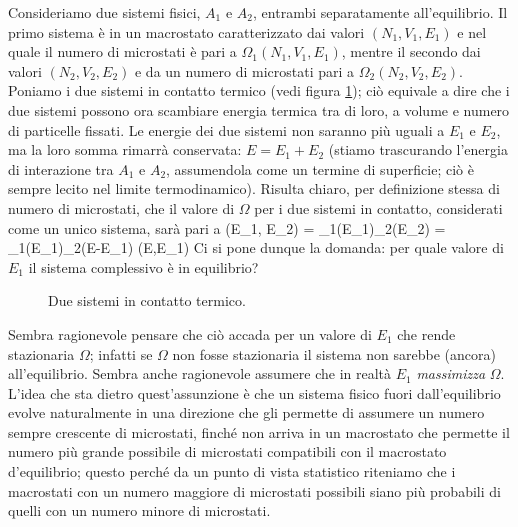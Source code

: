 Consideriamo due sistemi fisici, $A_{1}$ e $A_{2}$, entrambi separatamente all'equilibrio. Il primo sistema è in un macrostato caratterizzato dai valori $(N_{1},V_{1},E_{1})$ e nel quale il numero di microstati è pari a $\Omega_{1}(N_{1},V_{1},E_{1})$, mentre il secondo dai valori $(N_{2},V_{2},E_{2})$ e da un numero di microstati pari a $\Omega_{2}(N_{2},V_{2},E_{2})$. Poniamo i due sistemi in contatto termico (vedi figura \ref{fig:02-a1a2}); ciò equivale a dire che i due sistemi possono ora scambiare energia termica tra di loro, a volume e numero di particelle fissati. Le energie dei due sistemi non saranno più uguali a $E_{1}$ e $E_{2}$, ma la loro somma rimarrà conservata: $E = E_{1} + E_{2}$ (stiamo trascurando l'energia di interazione tra $A_{1}$ e $A_{2}$, assumendola come un termine di superficie; ciò è sempre lecito nel limite termodinamico). Risulta chiaro, per definizione stessa di numero di microstati, che il valore di $\Omega$ per i due sistemi in contatto, considerati come un unico sistema, sarà pari a
\be
\label{eq:02-omega}
\Omega(E_{1}, E_{2}) = \Omega_{1}(E_{1})\Omega_{2}(E_{2}) = \Omega_{1}(E_{1})\Omega_{2}(E-E_{1}) \equiv \Omega(E,E_{1})
\ee
Ci si pone dunque la domanda: per quale valore di $E_{1}$ il sistema complessivo è in equilibrio?

\begin{figure}[!ht]
  \centering
  
  \caption{Due sistemi in contatto termico.}
  \label{fig:02-a1a2}
\end{figure}

Sembra ragionevole pensare che ciò accada per un valore di $E_1$ che rende stazionaria $\Omega$; infatti se $\Omega$ non fosse stazionaria il sistema non sarebbe (ancora) all'equilibrio. Sembra anche ragionevole assumere che in realtà $E_{1}$ {\em massimizza} $\Omega$. L'idea che sta dietro quest'assunzione è che un sistema fisico fuori dall'equilibrio evolve naturalmente in una direzione che gli permette di assumere un numero sempre crescente di microstati, finché non arriva in un macrostato che permette il numero più grande possibile di microstati compatibili con il macrostato d'equilibrio; questo perché da un punto di vista statistico riteniamo che i macrostati con un numero maggiore di microstati possibili siano più probabili di quelli con un numero minore di microstati.


